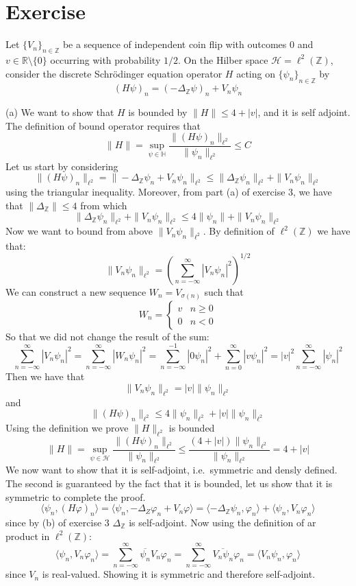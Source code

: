\documentclass{article}
\newcommand{\R}{\mathbb{R}}
\newcommand{\Z}{\mathbb{Z}}
\begin{document}
\section{Exercise}

Let ${\{ V_n \}}_{n \in \Z}$ be a sequence of independent coin flip with outcomes $0$ and $v\in \R \setminus \{0\}$ occurring with probability $1 / 2$. On the Hilber space $\mathcal H = \ell^2 (\Z)$, consider the discrete Schrödinger equation operator $H$ acting on ${\{ \psi_n \}}_{n \in \Z}$ by
\[
    {(H \psi)}_n = {(-\Delta_\Z \psi)}_n + V_n \psi_n
\]

(a) We want to show that $H$ is bounded by $\| H \| \leq 4 + |v|$, and it is self adjoint. The definition of bound operator requires that 
\[
    \| H \| = \sup_{\psi \in \mathbb H} \frac{\| {(H \psi)}_n \|_{\ell^2}}{\| \psi_n \|_{\ell^2}} \leq C
\]
Let us start by considering 
\[
    \| {(H \psi)}_n \|_{\ell^2} = \| - \Delta_\Z \psi_n  + V_n \psi_n\|_{\ell^2} \leq \| \Delta_\Z \psi_n \|_{\ell^2} + \| V_n \psi_n\|_{\ell^2}
\]
using the triangular inequality. Moreover, from part (a) of exercise 3, we have that $\| \Delta_\Z  \| \leq 4$ from which
\[
    \| \Delta_\Z \psi_n \|_{\ell^2} + \| V_n \psi_n\|_{\ell^2} \leq 4 \| \psi_n \| + \| V_n \psi_n\|_{\ell^2} 
\]
Now we want to bound from above $\| V_n \psi_n\|_{\ell^2}$. By definition of $\ell^2(\Z)$ we have that:
\[
    \| V_n \psi_n\|_{\ell^2} = {\left(\sum_{n= -\infty}^\infty |V_n \psi_n|^2\right)}^{1 / 2} 
\]
We can construct a new sequence $W_n = V_{\sigma(n)}$ such that
\[
    W_n = \begin{cases}
        v & n \geq 0\\
        0 & n < 0
    \end{cases}
\]
So that we did not change the result of the sum:
\[
    \sum_{n= -\infty}^\infty |V_n \psi_n|^2 = \sum_{n= -\infty}^\infty |W_n \psi_n|^2 = \sum_{n= -\infty}^{-1} |0 \psi_n|^2 + \sum_{n= 0}^\infty |v \psi_n|^2 = |v|^2 \sum_{n= -\infty}^\infty | \psi_n|^2
\]
Then we have that
\[
    \| V_n \psi_n\|_{\ell^2} = |v| \|\psi_n\|_{\ell^2}
\]
and
\[
    \| {(H \psi)}_n \|_{\ell^2} \leq 4 \| \psi_n \|_{\ell^2} + |v| \|\psi_n\|_{\ell^2}
\]
Using the definition we prove $\|H\|_{\ell^2}$ is bounded
\[
    \| H \| = \sup_{\psi \in \mathcal H} \frac{\| {(H \psi)}_n \|_{\ell^2}}{\| \psi_n \|_{\ell^2}} \leq \frac{(4 + |v|) \|\psi_n\|_{\ell^2}}{\|\psi_n\|_{\ell^2}} = 4 + |v|
\]
We now want to show that it is self-adjoint, i.e.\ symmetric and densly defined. The second is guaranteed by the fact that it is bounded, let us show that it is symmetric to complete the proof.
\[
    \langle \psi_n, {(H \varphi)}_n \rangle = \langle \psi_n , -\Delta_Z \varphi_n + V_n \varphi \rangle = \langle - \Delta_\Z \psi_n ,\varphi_n \rangle + \langle \psi_n , V_n \varphi_n \rangle
\]
since by (b) of exercise 3 $\Delta_\Z$ is self-adjoint. Now using the definition of ar product in $\ell^2(\Z)$:
\[
    \langle \psi_n ,V_n \varphi_n \rangle = \sum_{n = -\infty}^\infty \overline{\psi_n} V_n \varphi_n = \sum_{n = -\infty}^\infty \overline{V_n \psi_n} \varphi_n = \langle V_n \psi_n, \varphi_n \rangle
\]
since $V_n$ is real-valued. Showing it is symmetric and therefore self-adjoint.
\end{document}
